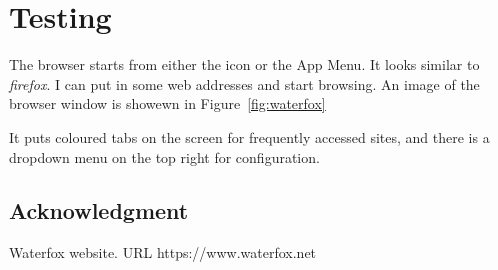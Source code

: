 \documentclass{article}  %
\begin{document}
\section{Testing}
The browser starts from either the icon or the App Menu. It looks similar to {\em firefox}. I can put in some web addresses and start browsing. An image of the browser window is showewn in Figure~\ref{fig:waterfox}

It puts coloured tabs on the screen for frequently accessed sites, and there is a dropdown menu on the top right for configuration. 


\subsection{Acknowledgment}

\begin{thebibliography}{99}

Waterfox website. URL https://www.waterfox.net

\end{thebibliography}
\end{document}
